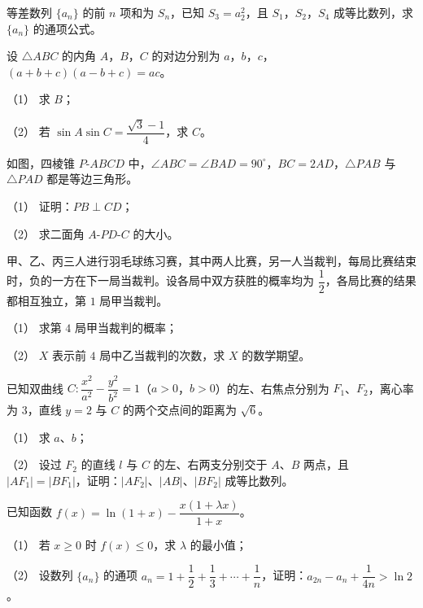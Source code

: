 \begin{question}
等差数列 $\{a_n\}$ 的前 $n$ 项和为 $S_n$，已知 $S_3=a_2^2$，且 $S_1$，$S_2$，$S_4$ 成等比数列，求 $\{a_n\}$ 的通项公式。

\end{question}
\begin{question}
设 $\triangle ABC$ 的内角 $A$，$B$，$C$ 的对边分别为 $a$，$b$，$c$，$(a+b+c)(a-b+c)=ac$。

（1） 求 $B$；

（2） 若 $\sin A\sin C=\dfrac{\sqrt3-1}4$，求 $C$。

\Needspace{0.4\textheight}
\end{question}
\begin{question}
如图，四棱锥 $P\text{-}ABCD$ 中，$\angle ABC=\angle BAD=90^\circ$，$BC=2AD$，$\triangle PAB$ 与 $\triangle PAD$ 都是等边三角形。

（1） 证明：$PB\perp CD$；

（2） 求二面角 $A\text{-}PD\text{-}C$ 的大小。
\nopagebreak[4]
\begin{center}\end{center}
\nopagebreak[4]
\end{question}
\begin{question}
甲、乙、丙三人进行羽毛球练习赛，其中两人比赛，另一人当裁判，每局比赛结束时，负的一方在下一局当裁判。设各局中双方获胜的概率均为 $\dfrac12$，各局比赛的结果都相互独立，第 $1$ 局甲当裁判。

（1） 求第 $4$ 局甲当裁判的概率；

（2） $X$ 表示前 $4$ 局中乙当裁判的次数，求 $X$ 的数学期望。

\end{question}
\begin{question}
已知双曲线 $C:\dfrac{x^2}{a^2}-\dfrac{y^2}{b^2}=1$（$a>0$，$b>0$）的左、右焦点分别为 $F_1$、$F_2$，离心率为 $3$，直线 $y=2$ 与 $C$ 的两个交点间的距离为 $\sqrt6$。

（1） 求 $a$、$b$；

（2） 设过 $F_2$ 的直线 $l$ 与 $C$ 的左、右两支分别交于 $A$、$B$ 两点，且 $|AF_1|=|BF_1|$，证明：$|AF_2|$、$|AB|$、$|BF_2|$ 成等比数列。

\end{question}
\begin{question}
已知函数 $f(x)=\ln(1+x)-\dfrac{x(1+\lambda x)}{1+x}$。

（1） 若 $x\geqslant0$ 时 $f(x)\leqslant0$，求 $\lambda$ 的最小值；

（2） 设数列 $\{a_n\}$ 的通项 $a_n=1+\dfrac12+\dfrac13+\cdots+\dfrac1n$，证明：$a_{2n}-a_n+\dfrac1{4n}>\ln2$。

\end{question}
